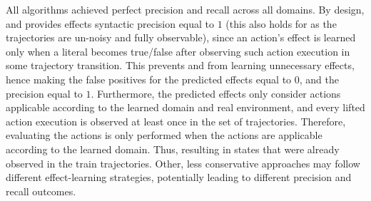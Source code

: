 All algorithms achieved perfect precision and recall across all domains. 
By design, \samshort{} and \offlam{} provides effects syntactic precision equal to $1$ (this also holds for \nolam{} as the trajectories are un-noisy and fully observable), since an action's effect is learned only when a literal becomes true/false after observing such action execution in some trajectory transition. This prevents \samshort{} and \offlam{} from learning unnecessary effects, hence making the false positives for the predicted effects equal to $0$, and the precision equal to $1$. 
Furthermore, the predicted effects only consider actions applicable according to the learned domain and real environment, and every lifted action execution is observed at least once in the set of trajectories. Therefore, evaluating the actions is only performed when the actions are applicable according to the learned domain. Thus, resulting in states that were already observed in the train trajectories.
Other, less conservative approaches may follow different effect-learning strategies, potentially leading to different precision and recall outcomes.




